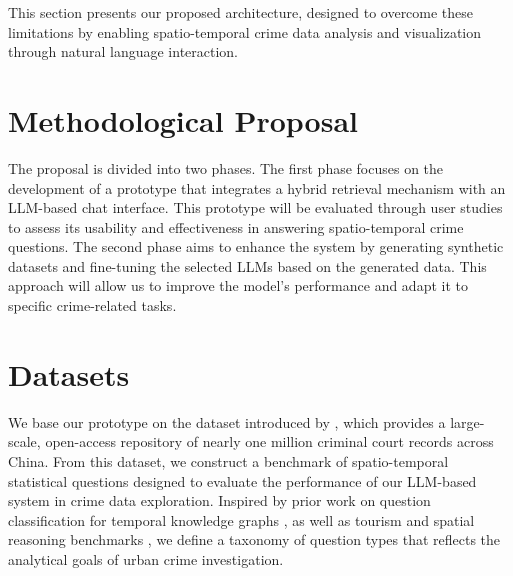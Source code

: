 This section presents our proposed architecture, designed to overcome these limitations by enabling spatio-temporal crime data analysis and visualization through natural language interaction.



\section{Methodological Proposal}

The proposal is divided into two phases. The first phase focuses on the development of a prototype that integrates a hybrid retrieval mechanism with an LLM-based chat interface. This prototype will be evaluated through user studies to assess its usability and effectiveness in answering spatio-temporal crime questions. The second phase aims to enhance the system by generating synthetic datasets and fine-tuning the selected LLMs based on the generated data. This approach will allow us to improve the model's performance and adapt it to specific crime-related tasks.

\cite{Moshkov2025AIMO2}

\section{Datasets}


We base our prototype on the dataset introduced by \cite{Zhang2025CrimeDatasetChina}, which provides a large-scale, open-access repository of nearly one million criminal court records across China. From this dataset, we construct a benchmark of spatio-temporal statistical questions designed to evaluate the performance of our LLM-based system in crime data exploration. Inspired by prior work on question classification for temporal knowledge graphs \cite{Saxena2021TemporalKGQA}, as well as tourism and spatial reasoning benchmarks \cite{Contractor2020QATourism, Dai2024QASTKG}, we define a taxonomy of question types that reflects the analytical goals of urban crime investigation.

